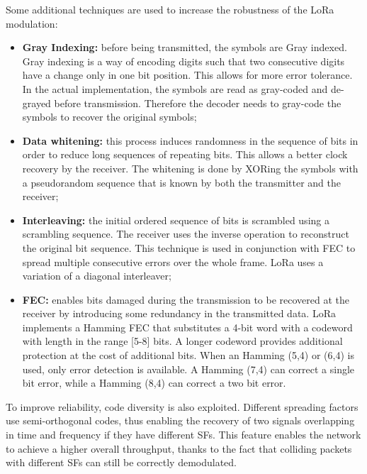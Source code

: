 Some additional techniques are used to increase the robustness of the LoRa modulation:

\begin{itemize}

\item \textbf{Gray Indexing:} before being transmitted, the symbols are Gray indexed. Gray indexing is a way of encoding digits such that two consecutive digits have a change only in one bit position. This allows for more error tolerance. In the actual implementation, the symbols are read as gray-coded and de-grayed before transmission. Therefore the decoder needs to gray-code the symbols to recover the original symbols;

\item \textbf{Data whitening:} this process induces randomness in the sequence of bits in order to reduce long sequences of repeating bits. This allows a better clock recovery by the receiver. The whitening is done by XORing the symbols with a pseudorandom sequence that is known by both the transmitter and the receiver;
    
\item \textbf{Interleaving:} the initial ordered sequence of bits is scrambled using a scrambling sequence. The receiver uses the inverse operation to reconstruct the original bit sequence. This technique is used in conjunction with \gls{FEC} to spread multiple consecutive errors over the whole frame. LoRa uses a variation of a diagonal interleaver;

\item \textbf{\gls{FEC}:} enables bits damaged during the transmission to be recovered at the receiver by introducing some redundancy in the transmitted data. LoRa implements a Hamming \gls{FEC} that substitutes a 4-bit word with a codeword with length in the range [5-8] bits. A longer codeword provides additional protection at the cost of additional bits. When an Hamming (5,4) or (6,4) is used, only error detection is available. A Hamming (7,4) can correct a single bit error, while a Hamming (8,4) can correct a two bit error.

\end{itemize}

To improve reliability, code diversity is also exploited. Different spreading factors use semi-orthogonal codes, thus enabling the recovery of two signals overlapping in time and frequency if they have different \glspl{SF}. This feature enables the network to achieve a higher overall throughput, thanks to the fact that colliding packets with different \glspl{SF} can still be correctly demodulated.

